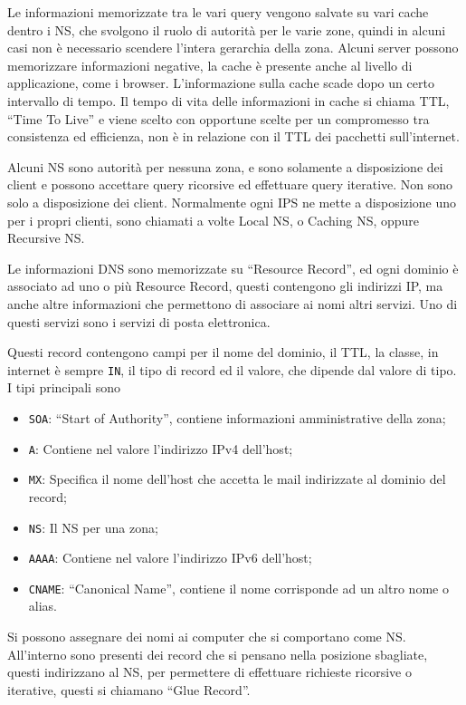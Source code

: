 \documentclass{article}
\numberwithin{equation}{subsection}
\begin{document}


Le informazioni memorizzate tra le vari query vengono salvate su vari cache dentro i NS, che svolgono il ruolo di autorità per le varie zone, quindi in alcuni casi 
non è necessario scendere l'intera gerarchia della zona. 
Alcuni server possono memorizzare informazioni negative, la cache è presente anche al livello di applicazione, come i browser. 
L'informazione sulla cache scade dopo un certo intervallo di tempo. Il tempo di vita delle informazioni in cache si chiama TTL, ``Time To Live'' e viene scelto con 
opportune scelte per un compromesso tra consistenza ed efficienza, non è in relazione con il TTL dei pacchetti sull'internet. 

Alcuni NS sono autorità per nessuna zona, e sono solamente a disposizione dei client e possono accettare query ricorsive ed effettuare query iterative. 
Non sono solo a disposizione dei client. Normalmente ogni IPS ne mette a disposizione uno per i propri clienti, sono chiamati a volte Local NS, o Caching NS, oppure 
Recursive NS. 

Le informazioni DNS sono memorizzate su ``Resource Record'', ed ogni dominio è associato ad uno o più Resource Record, questi contengono gli indirizzi IP, ma anche 
altre informazioni che permettono di associare ai nomi altri servizi. Uno di questi servizi sono i servizi di posta elettronica. 

Questi record contengono campi per il nome del dominio, il TTL, la classe, in internet è sempre \texttt{IN}, il tipo di record ed il valore, che dipende dal valore di 
tipo. I tipi principali sono 
\begin{itemize}
    \item \texttt{SOA}: ``Start of Authority'', contiene informazioni amministrative della zona;
    \item \texttt{A}: Contiene nel valore l'indirizzo IPv4 dell'host;
    \item \texttt{MX}: Specifica il nome dell'host che accetta le mail indirizzate al dominio del record;
    \item \texttt{NS}: Il NS per una zona;
    \item \texttt{AAAA}: Contiene nel valore l'indirizzo IPv6 dell'host;
    \item \texttt{CNAME}: ``Canonical Name'', contiene il nome corrisponde ad un altro nome o alias.  
\end{itemize}

Si possono assegnare dei nomi ai computer che si comportano come NS. All'interno sono presenti dei record che si pensano nella posizione sbagliate, questi 
indirizzano al NS, per permettere di effettuare richieste ricorsive o iterative, questi si chiamano ``Glue Record''. %
\end{document}
